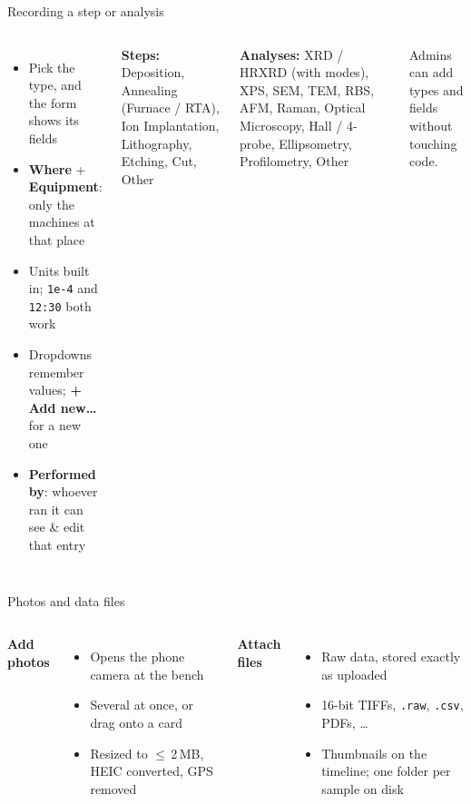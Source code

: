 \documentclass[aspectratio=169,11pt]{beamer}
\newcommand{\ui}[1]{\textsf{\textbf{#1}}}
\begin{document}
\begin{frame}{Recording a step or analysis}
  \begin{columns}[T]
    \begin{itemize}
      \item Pick the type, and the form shows its fields
      \item \textbf{Where} + \textbf{Equipment}: only the machines at that place
      \item Units built in; \texttt{1e-4} and \texttt{12:30} both work
      \item Dropdowns remember values; \ui{+ Add new\ldots} for a new one
      \item \textbf{Performed by}: whoever ran it can see \& edit that entry
    \end{itemize}
    \small
    \textbf{Steps:} Deposition, Annealing (Furnace / RTA), Ion
    Implantation, Lithography, Etching, Cut, Other

    \vspace{0.3cm}
    \textbf{Analyses:} XRD / HRXRD (with modes), XPS, SEM, TEM, RBS, AFM,
    Raman, Optical Microscopy, Hall / 4-probe, Ellipsometry, Profilometry, Other

    \vspace{0.3cm}
    \footnotesize Admins can add types and fields without touching code.
  \end{columns}
\end{frame}

\begin{frame}{Photos and data files}
  \begin{columns}[T]
    \textbf{\ui{Add photos}}
    \begin{itemize}
      \item Opens the phone camera at the bench
      \item Several at once, or drag onto a card
      \item Resized to $\leq$\,2\,MB, HEIC converted, GPS removed
    \end{itemize}
    \textbf{\ui{Attach files}}
    \begin{itemize}
      \item Raw data, \alert{stored exactly as uploaded}
      \item 16-bit TIFFs, \texttt{.raw}, \texttt{.csv}, PDFs, \ldots
      \item Thumbnails on the timeline; one folder per sample on disk
    \end{itemize}
  \end{columns}
\end{frame}
\end{document}
